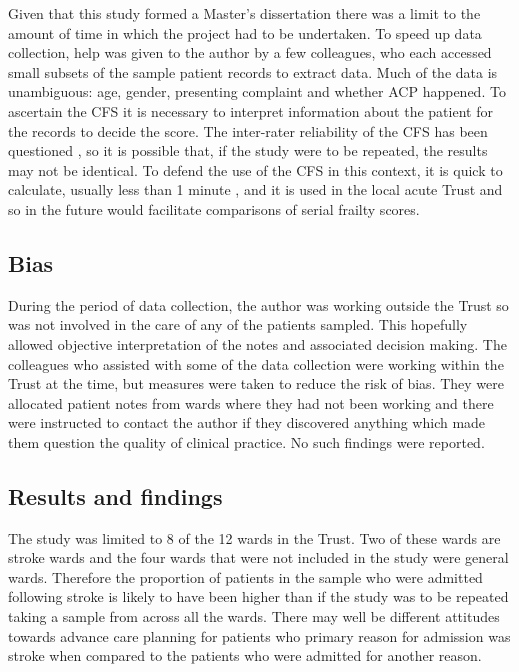 \documentclass
[
	12pt,
	a4paper,
	oneside,
]{report}
\begin{document}
Given that this study formed a Master's dissertation there was a limit to the
amount of time in which the project had to be undertaken. To speed up data 
collection, help was given to the author by a few
colleagues, who each accessed small subsets of the sample patient records to 
extract data. Much of the data is unambiguous: age, gender, presenting complaint
and whether ACP happened. To ascertain the CFS it is necessary to interpret 
information about the patient for the records to decide the score. The
inter-rater reliability of the CFS has been questioned \parencite{gilbert:18},
so it is possible that, 
if the study were to be repeated, the results may not be identical.
To defend the use of the CFS in this context, it is quick to calculate, usually 
less than 1 minute \parencite{elliott:17}, and it is used in the local acute
Trust and so in the future would facilitate comparisons of serial frailty
scores.

\subsection{Bias} 
During the period of data collection, the author was working outside the Trust 
so was not involved in the care of any of the patients sampled. This hopefully 
allowed objective interpretation of the notes and associated decision making.
The colleagues who assisted with some of the data collection were working 
within the Trust at the time, but measures were taken to reduce the risk of 
bias. They were allocated patient notes from wards where they had not been
working and there were instructed to contact the author if they discovered
anything which made them question the quality of clinical practice. No such
findings were reported.

\subsection{Results and findings}

The study was limited to 8 of the 12 wards in the Trust. Two of these wards
are stroke wards and the four wards that were not included in the study were 
general wards. Therefore the proportion of patients in the sample
who were admitted following stroke is likely to have been higher than if the 
study was to be repeated taking a sample from across all the wards. There may 
well be different attitudes towards advance care planning for patients who 
primary reason for admission was stroke when compared to the patients who
were admitted for another reason.
\end{document}
